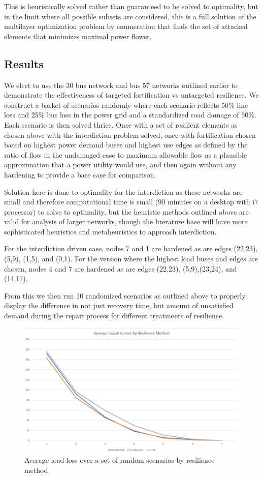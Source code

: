 \documentclass{article}
\begin{document}
	This is heuristically solved rather than guaranteed to be solved to optimality, but in the limit where all possible subsets are considered, this is a full solution of the multilayer optimization problem by enumeration that finds the set of attacked elements that minimizes maximal power flower. 
	\subsection{Results}
	We elect to use the 30 bus network and bus 57 networks outlined earlier to demonstrate the effectiveness of targeted fortification vs untargeted resilience. We construct a basket of scenarios randomly where each scenario reflects 50\% line loss and 25\% bus loss in the power grid and a standardized road damage of 50\%. Each scenario is then solved thrice. Once with a set of resilient elements as chosen above with the interdiction problem solved, once with fortification chosen based on highest power demand buses and highest use edges as defined by the ratio of flow in the undamaged case to maximum allowable flow as a plausible approximation that a power utility would use, and then again without any hardening to provide a base case for comparison.
	
	Solution here is done to optimality for the interdiction as these networks are small and therefore computational time is small (90 minutes on a desktop with i7 processor) to solve to optimality, but the heuristic methods outlined above are valid for analysis of larger networks, though the literature base will have more sophisticated heuristics and metaheuristics to approach interdiction.
	
	For the interdiction driven case, nodes 7 and 1 are hardened as are edges (22,23), (5,9), (1,5), and (0,1). For the version where the highest load buses and edges are chosen, nodes 4 and 7 are hardened as are edges (22,23), (5,9),(23,24), and (14,17).
	
	From this we then run 10 randomized scenarios as outlined above to properly display the difference in not just recovery time, but amount of unsatisfied demand during the repair process for different treatments of resilience.
\begin{figure}[htbp]
	\centering
	\includegraphics[width=.9\linewidth]{AverageSpaghetti.png}
	\caption{Average load loss over a set of random scenarios by resilience method}
\end{figure}
	
\end{document}
